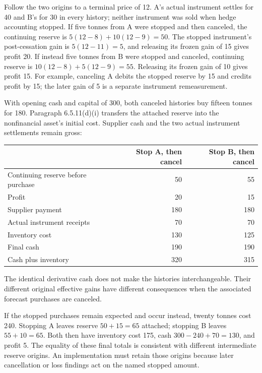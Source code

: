 Follow the two origins to a terminal price of 12. A's actual instrument
settles for 40 and B's for 30 in every history; neither instrument was sold
when hedge accounting stopped. If five tonnes from A were stopped and then
canceled, the continuing reserve is
\(5(12-8)+10(12-9)=50\). The stopped instrument's post-cessation gain is
\(5(12-11)=5\), and releasing its frozen gain of 15 gives profit 20.
If instead five tonnes from B were stopped and canceled, continuing reserve
is \(10(12-8)+5(12-9)=55\). Releasing its frozen gain of 10 gives profit 15.
For example, canceling A debits the stopped reserve by 15 and credits profit
by 15; the later gain of 5 is a separate instrument remeasurement.

With opening cash and capital of 300, both canceled histories buy fifteen
tonnes for 180. Paragraph 6.5.11(d)(i) transfers the attached reserve into
the nonfinancial asset's initial cost. Supplier cash and the two actual
instrument settlements remain gross:
\begin{center}
\small
\begin{tabular}{lrr}
\toprule
& Stop A, then cancel & Stop B, then cancel\\
\midrule
Continuing reserve before purchase &50&55\\
Profit &20&15\\
Supplier payment &180&180\\
Actual instrument receipts &70&70\\
Inventory cost &130&125\\
Final cash &190&190\\
Cash plus inventory &320&315\\
\bottomrule
\end{tabular}
\end{center}
The identical derivative cash does not make the histories interchangeable.
Their different original effective gains have different consequences when
the associated forecast purchases are canceled.

If the stopped purchases remain expected and occur instead, twenty tonnes
cost 240. Stopping A leaves reserve \(50+15=65\) attached; stopping B leaves
\(55+10=65\). Both then have inventory cost 175, cash
\(300-240+70=130\), and profit 5. The equality of these final totals is
consistent with different intermediate reserve origins. An implementation
must retain those origins because later cancellation or loss findings act
on the named stopped amount.

